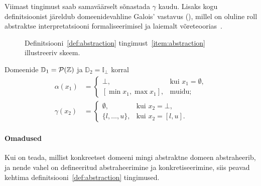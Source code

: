 \documentclass[../thesis.tex]{subfiles}
\begin{document}
Viimast tingimust saab samaväärselt sõnastada $\gamma$ kaudu. Lisaks kogu definitsioonist järeldub domeenidevahline Galois' vastavus (), millel on oluline roll abstraktse interpretatsiooni formaliseerimisel ja laiemalt võreteoorias~\cite{cousot77}.

\begin{figure}
	\centering
	\caption{Definitsiooni~\ref{def:abstraction} tingimust~\ref{item:abstraction} illustreeriv skeem.}
	\label{fig:abstraction}
\end{figure}

Domeenide $\mathbb{D}_1 = \mathcal{P}(\mathbb{Z})$ ja $\mathbb{D}_2 = \mathbb{I}_\bot$ korral~\cite[243]{cousot77}
\begin{align*}
	\alpha(x_1) &= \begin{cases}
		\bot, & \text{kui } x_1 = \emptyset, \\
		[\min x_1, \max x_1], & \text{muidu};
	\end{cases} \\
	\gamma(x_2) &= \begin{cases}
		\emptyset, & \text{kui } x_2 = \bot, \\
		\{l, \ldots, u\}, & \text{kui } x_2 = [l, u].
	\end{cases}
\end{align*}

\paragraph{Omadused}
Kui on teada, millist konkreetset domeeni mingi abstraktne domeen abstraheerib, ja nende vahel on defineeritud abstraheerimine ja konkretiseerimine, siis peavad kehtima definitsiooni~\ref{def:abstraction} tingimused.
\end{document}
